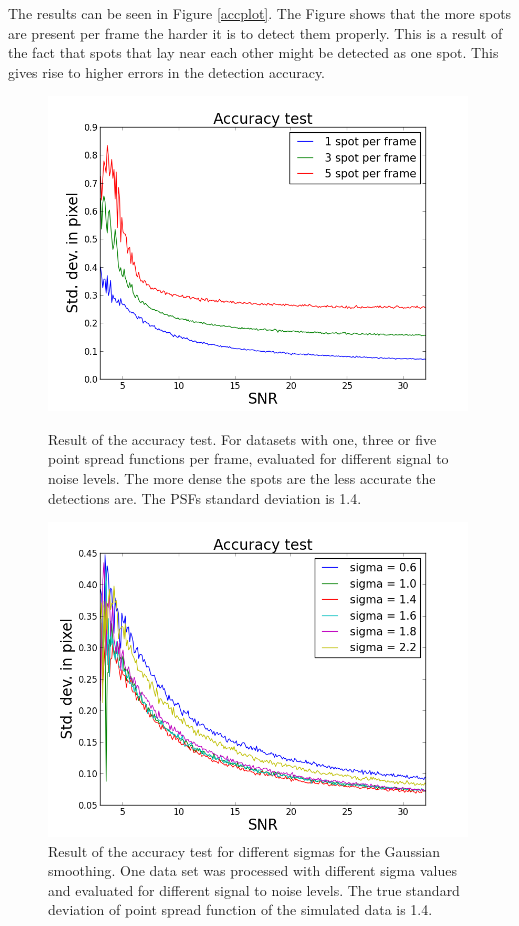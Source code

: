 The results can be seen in Figure \ref{accplot}. The Figure shows that the more spots are present per frame the harder it is to detect them properly. This is a result of the fact that spots that lay near each other might be detected as one spot. This gives rise to higher errors in the detection accuracy.


\begin{figure}
\begin{minipage}[t]{0.48\textwidth}
\includegraphics[width = 0.99\textwidth]{pictures/AccuracyTest.png}
	\caption{Result of the accuracy test. For datasets with one, three or five point spread functions per frame, evaluated for different signal to noise levels. The more dense the spots are the less accurate the detections are. The PSFs standard deviation is 1.4.}
	\label{accplot}	
\end{minipage}\hfill
\begin{minipage}[t]{0.48\textwidth}
\centering
\includegraphics[width = 0.99\textwidth]{pictures/AccuracyTestSigma.png}
	\caption{Result of the accuracy test for different sigmas for the Gaussian smoothing. One data set was processed with different sigma values and evaluated for different signal to noise levels. The true standard deviation of point spread function of the simulated data is 1.4.}
	\label{accplot2}

\end{minipage}
\end{figure}


